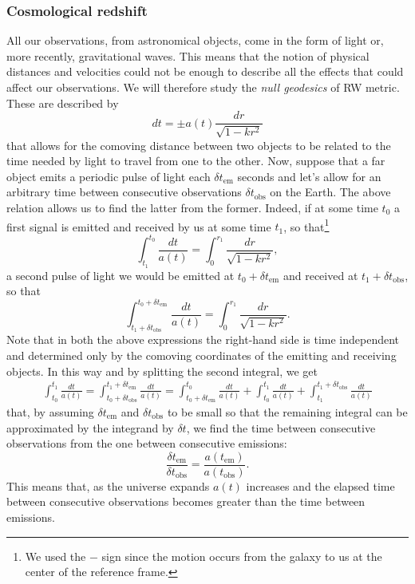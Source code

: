 \subsubsection{Cosmological redshift}
All our observations, from astronomical objects, come in the form of light or, more recently, gravitational waves. This means that the notion of physical distances and velocities could not be enough to describe all the effects that could affect our observations. We will therefore study the \emph{null geodesics} of RW metric. These are described by $$dt=\pm a(t)\frac{dr}{\sqrt{1-kr^2}}$$ that allows for the comoving distance between two objects to be related to the time needed by light to travel from one to the other. Now, suppose that a far object emits a periodic pulse of light each $\delta t_{\text{em}}$ seconds and let's allow for an arbitrary time between consecutive observations $\delta t_{\text{obs}}$ on the Earth. The above relation allows us to find the latter from the former. Indeed, if at some time $t_0$ a first signal is emitted and received by us at some time $t_1$, so that\footnote{We used the $-$ sign since the motion occurs from the galaxy to us at the center of the reference frame.}
$$\int_{t_1}^{t_0}\frac{dt}{a(t)}=\int_{0}^{r_1}\frac{dr}{\sqrt{1-kr^2}},$$ a second pulse of light we would be emitted at $t_0+\delta t_{\text{em}}$ and received at $t_1+\delta t_{\text{obs}}$, so that $$\int_{t_1+\delta t_{\text{obs}}}^{t_0+\delta t_{\text{em}}}\frac{dt}{a(t)}=\int_{0}^{r_1}\frac{dr}{\sqrt{1-kr^2}}.$$Note that in both the above expressions the right-hand side is time independent and determined only by the comoving coordinates of the emitting and receiving objects. In this way and by splitting the second integral, we get
\begin{align*}
    \int^{t_1}_{t_0}\frac{dt}{a(t)}=\int^{t_1+\delta t_{\text{em}}}_{t_0+\delta t_{\text{obs}}}\frac{dt}{a(t)}=\int_{t_0+\delta t_{\text{em}}}^{t_0}\frac{dt}{a(t)}+\int^{t_1}_{t_0}\frac{dt}{a(t)}+\int^{t_1+\delta t_{\text{obs}}}_{t_1}\frac{dt}{a(t)}
\end{align*}
that, by assuming $\delta t_{\text{em}}$ and $\delta t_{\text{obs}}$ to be small so that the remaining integral can be approximated by the integrand by $\delta t$, we find the time between consecutive observations from the one between consecutive emissions:
\begin{equation}
    \label{eq:delta_t1/delta_t2}
    \frac{\delta t_{\text{em}}}{\delta t_{\text{obs}}}=\frac{a(t_{\text{em}})}{a(t_{\text{obs}})}.
\end{equation}
This means that, as the universe expands $a(t)$ increases and the elapsed time between consecutive observations becomes greater than the time between emissions.

